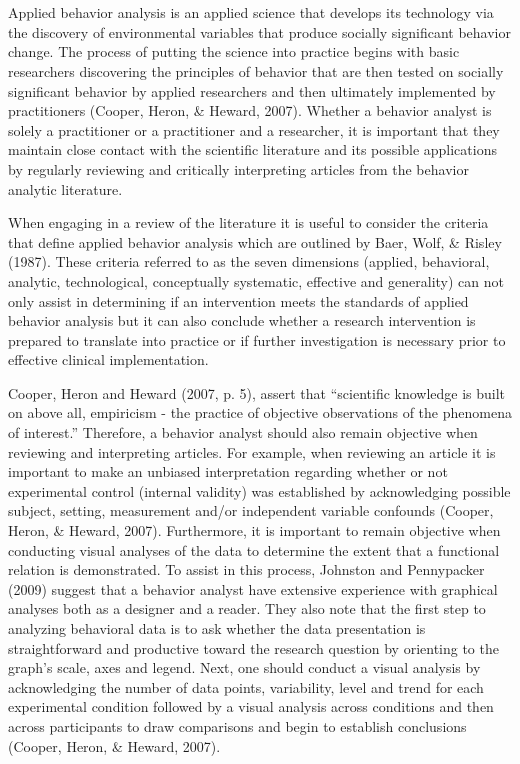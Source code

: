 \clearpage \section[\fourbTwo{}]{\fourbTwo{}%
              }
Applied behavior analysis is an applied science that develops its technology via the discovery of environmental variables that produce socially significant behavior change. The process of putting the science into practice begins with basic researchers discovering the principles of behavior that are then tested on socially significant behavior by applied researchers and then ultimately implemented by practitioners (Cooper, Heron, \& Heward, 2007). Whether a behavior analyst is solely a practitioner or a practitioner and a researcher, it is important that they maintain close contact with the scientific literature and its possible applications by regularly reviewing and critically interpreting articles from the behavior analytic literature.

When engaging in a review of the literature it is useful to consider the criteria that define applied behavior analysis which are outlined by Baer, Wolf, \& Risley (1987). These criteria referred to as the seven dimensions (applied, behavioral, analytic, technological, conceptually systematic, effective and generality) can not only assist in determining if an intervention  meets the standards of applied behavior analysis but it can also conclude whether a research intervention is prepared to translate into  practice or if further investigation is necessary prior to  effective clinical implementation.

Cooper, Heron and Heward (2007, p. 5), assert that ``scientific knowledge is built on above all, empiricism - the practice of objective observations of the phenomena of interest.'' Therefore, a behavior analyst should also remain objective when reviewing and interpreting articles.  For example, when reviewing an article it is important to make an unbiased interpretation regarding whether or not experimental control (internal validity) was established by acknowledging possible subject, setting, measurement and/or independent variable confounds (Cooper, Heron, \& Heward, 2007). Furthermore, it is important to remain objective when conducting visual analyses of the data to determine the extent that a functional relation is demonstrated. To assist in this process, Johnston and Pennypacker (2009) suggest that a behavior analyst have extensive experience with graphical analyses both as a designer and a reader.  They also note that the first step to analyzing behavioral data is to ask whether the data presentation is straightforward and productive toward the research question by orienting to the graph's scale, axes and legend.  Next, one should conduct a visual analysis by acknowledging the number of data points, variability, level and trend for each experimental condition followed by a visual analysis across conditions  and then across participants to draw comparisons and begin to establish conclusions (Cooper, Heron, \& Heward, 2007).

